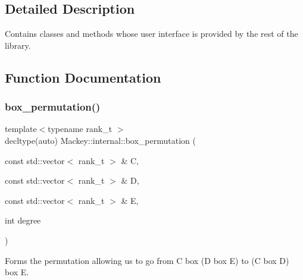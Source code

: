 \subsection{Detailed Description}
Contains classes and methods whose user interface is provided by the rest of the library. 

\subsection{Function Documentation}
\mbox{\label{namespaceMackey_1_1internal_a4b352efa632d7cfab147b728a0d39491}} 
\subsubsection{\texorpdfstring{box\+\_\+permutation()}{box\_permutation()}}
{\footnotesize\ttfamily template$<$typename rank\+\_\+t $>$ \\
decltype(auto) Mackey\+::internal\+::box\+\_\+permutation (\begin{DoxyParamCaption}\item[{const std\+::vector$<$ rank\+\_\+t $>$ \&}]{C,  }\item[{const std\+::vector$<$ rank\+\_\+t $>$ \&}]{D,  }\item[{const std\+::vector$<$ rank\+\_\+t $>$ \&}]{E,  }\item[{int}]{degree }\end{DoxyParamCaption})}



Forms the permutation allowing us to go from C box (D box E) to (C box D) box E. 

